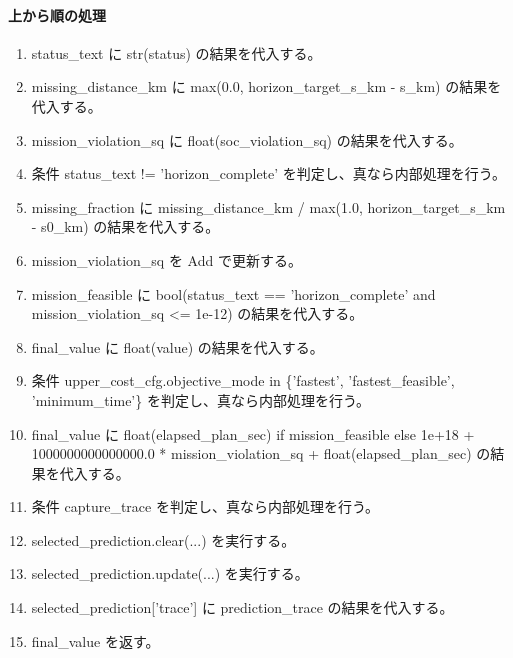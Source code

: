 \documentclass[a4paper,11pt]{article}
\begin{document}
            \paragraph{上から順の処理}
            \begin{enumerate}[leftmargin=1.8em]
            \item status\_text に str(status) の結果を代入する。
\item missing\_distance\_km に max(0.0, horizon\_target\_s\_km - s\_km) の結果を代入する。
\item mission\_violation\_sq に float(soc\_violation\_sq) の結果を代入する。
\item 条件 status\_text != 'horizon\_complete' を判定し、真なら内部処理を行う。
\item   missing\_fraction に missing\_distance\_km / max(1.0, horizon\_target\_s\_km - s0\_km) の結果を代入する。
\item   mission\_violation\_sq を Add で更新する。
\item mission\_feasible に bool(status\_text == 'horizon\_complete' and mission\_violation\_sq <= 1e-12) の結果を代入する。
\item final\_value に float(value) の結果を代入する。
\item 条件 upper\_cost\_cfg.objective\_mode in \{'fastest', 'fastest\_feasible', 'minimum\_time'\} を判定し、真なら内部処理を行う。
\item   final\_value に float(elapsed\_plan\_sec) if mission\_feasible else 1e+18 + 1000000000000000.0 * mission\_violation\_sq + float(elapsed\_plan\_sec) の結果を代入する。
\item 条件 capture\_trace を判定し、真なら内部処理を行う。
\item   selected\_prediction.clear(...) を実行する。
\item   selected\_prediction.update(...) を実行する。
\item   selected\_prediction['trace'] に prediction\_trace の結果を代入する。
\item final\_value を返す。
            \end{enumerate}
\end{document}
